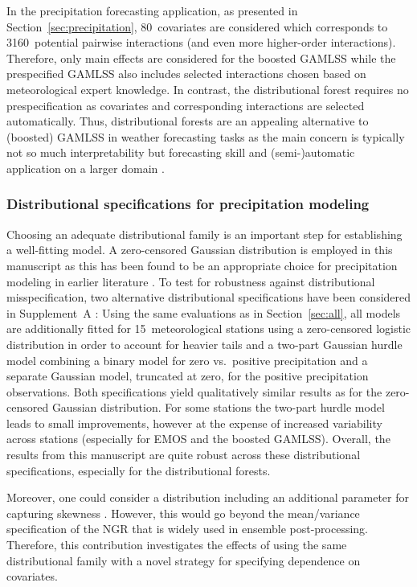 \documentclass[aoas, preprint]{imsart}
\numberwithin{equation}{subsection}
\begin{document}
In the precipitation forecasting application, as presented in 
Section~\ref{sec:precipitation}, 80~covariates are considered which corresponds 
to 3160~potential pairwise interactions (and even more higher-order interactions). 
Therefore, only main effects are considered for the boosted GAMLSS while
the prespecified GAMLSS also includes selected interactions chosen based on
meteorological expert knowledge. In contrast, the distributional forest requires no
prespecification as covariates and corresponding interactions are selected automatically.
Thus, distributional forests are an appealing alternative to (boosted) GAMLSS
in weather forecasting tasks as the main concern is typically not so much
interpretability but forecasting skill and (semi-)automatic application on a
larger domain \citep[see also the discussion in][]{Rasp+Lerch:2018}.


\subsubsection*{Distributional specifications for precipitation modeling}

Choosing an adequate distributional family is an important step for
establishing a well-fitting model. A zero-censored Gaussian distribution is
employed in this manuscript as this has been found to be an appropriate choice
for precipitation modeling in earlier literature
\citep[e.g.,][]{Stauffer+Mayr+Messner:2017}. 
To test for robustness against distributional misspecification, 
two alternative distributional specifications have been considered
in Supplement~A \citep{Schlosser+Hothorn+Stauffer:2019a}: Using the
same evaluations as in Section~\ref{sec:all}, all models are
additionally fitted for 15~meteorological stations using a zero-censored
logistic distribution in order to account for heavier tails and a two-part
Gaussian hurdle model combining a binary model for zero vs.~positive
precipitation and a separate Gaussian model, truncated at zero, for the
positive precipitation observations. Both specifications yield qualitatively 
similar results as for the zero-censored Gaussian distribution. For some stations
the two-part hurdle model leads to small improvements, however at the expense
of increased variability across stations (especially for EMOS and the 
boosted GAMLSS). Overall, the results from this manuscript are quite
robust across these distributional specifications, especially for the
distributional forests.

Moreover, one could consider a distribution including an additional parameter
for capturing skewness \citep[as in][]{Scheuerer+Hamill:2015, Baran+Nemoda:2016}. 
However, this would go beyond the mean/variance specification of the NGR
that is widely used in ensemble post-processing. Therefore, this contribution
investigates the effects of using the same distributional family with a novel
strategy for specifying dependence on covariates.
\end{document}
